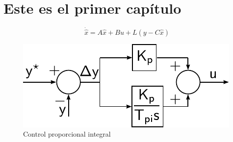 \chapter{Este es el primer capítulo}


\begin{equation}
	\dot {\hat x} = A \hat x + B u + L \left( y - C \hat x \right)  
\end{equation}

 
\begin{figure}
	\includegraphics[width=\textwidth]{model/pdf/pi.pdf} 
	\caption{Control proporcional integral}
	\label{ctrl_pi}
\end{figure}
 
 
 \cite{Rodriguez2007}
 
 

